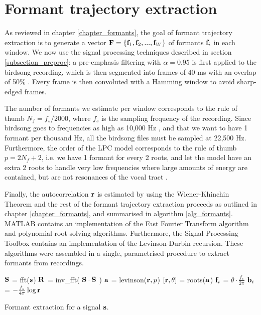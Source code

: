 \documentclass[../main.tex]{subfiles}
\begin{document}
\section{Formant trajectory extraction} \label{section_impformants}
As reviewed in chapter \ref{chapter_formants}, the goal of formant trajectory extraction is to generate a vector $\mathbf{F} = \{\mathbf{f}_1, \mathbf{f}_2, ..., \mathbf{f}_W\}$ of formants $\mathbf{f}_i$ in each window. We now use the signal processing techniques described in section \ref{subsection_preproc}: a pre-emphasis filtering with $\alpha = 0.95$ is first applied to the birdsong recording, which is then segmented into frames of 40 ms with an overlap of 50\% \cite{Stowell2014}. Every frame is then convoluted with a Hamming window to avoid sharp-edged frames. 
\par The number of formants we estimate per window corresponds to the rule of thumb $N_f = f_s / 2000$, where $f_s$ is the sampling frequency of the recording. Since birdsong goes to frequencies as high as 10,000 Hz \cite{Marler2004}, and that we want to have 1 formant per thousand Hz, all the birdsong files must be sampled at 22,500 Hz. Furthermore, the order of the LPC model corresponds to the rule of thumb $p = 2N_f + 2$, i.e. we have 1 formant for every 2 roots, and let the model have an extra 2 roots to handle very low frequencies where large amounts of energy are contained, but are not resonances of the vocal tract \cite{Benesty}. 
\par Finally, the autocorrelation $\mathbf{r}$ is estimated by using the Wiener-Khinchin Theorem and the rest of the formant trajectory extraction proceeds as outlined in chapter \ref{chapter_formants}, and summarised in algorithm \ref{alg_formants}. MATLAB contains an implementation of the Fast Fourier Transform algorithm and polynomial root solving algorithms. Furthermore, the Signal Processing Toolbox contains an implementation of the Levinson-Durbin recursion. These algorithms were assembled in a single, parametrised procedure to extract formants from recordings.

\begin{algorithm}
\begin{algorithmic}[1]
\State $\mathbf{S}$ = fft($\mathbf{s}$)
\State $\mathbf{R}$ = inv\_fft( $\mathbf{S} \cdot \bar{\mathbf{S}}$ )
\State $\mathbf{a}$ = levinson($\mathbf{r}, p$)
\State $\left[\mathbf{r}, \theta\right]$ = roots($\mathbf{a}$)
\State $\mathbf{f}_i$ = $\theta \cdot \frac{f_s}{2\pi}$
\State $\mathbf{b}_i$ = $-\frac{f_s}{4\pi}\log{\mathbf{r}}$
\EndFunction
\caption{Formant extraction for a signal $\mathbf{s}$.}\label{alg_formants}
\end{algorithmic}
\end{algorithm}
\end{document}
